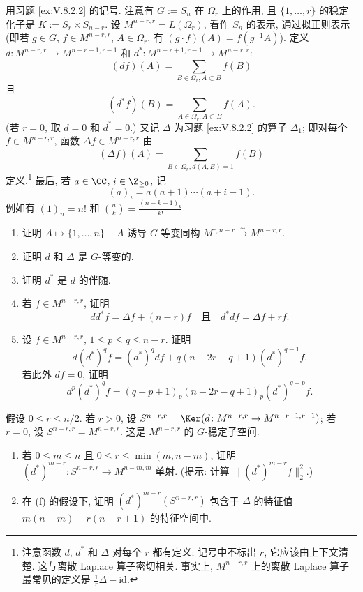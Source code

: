 \begin{exercise}[对称幂的分解]
\label{ex:V.8.2.3}
用习题 \ref{ex:V.8.2.2} 的记号. 注意有 $G := S_n$ 在 $\Omega_r$ 上的作用, 且 $\{1, \ldots, r\}$ 的稳定化子是 $K := S_r \times S_{n-r}$. 设 $M^{n-r,r} = L(\Omega_r)$, 看作 $S_n$ 的表示, 通过拟正则表示 (即若 $g \in G$, $f \in M^{n-r,r}$, $A \in \Omega_r$, 有 $(g \cdot f)(A) = f(g^{-1}A)$).
定义 $d \colon M^{n-r,r} \to M^{n-r+1,r-1}$ 和 $d^* \colon M^{n-r+1,r-1} \to M^{n-r,r}$:
\[
(df)(A) = \sum_{B \in \Omega_r, A \subset B}f(B)
\]
且
\[
(d^*f)(B) = \sum_{A \in \Omega_r, A \subset B}f(A).
\]
(若 $r = 0$, 取 $d = 0$ 和 $d^* = 0$.)
又记 $\Delta$ 为习题 \ref{ex:V.8.2.2} 的算子 $\Delta_1$; 即对每个 $f \in M^{n-r,r}$, 函数 $\Delta f \in M^{n-r,r}$ 由
\[
(\Delta f)(A) = \sum_{B \in \Omega_r, d(A,B)=1}f(B)
\]
定义.\footnote{注意函数 $d$, $d^*$ 和 $\Delta$ 对每个 $r$ 都有定义; 记号中不标出 $r$, 它应该由上下文清楚. 这与离散 Laplace 算子密切相关. 事实上, $M^{n-r,r}$ 上的离散 Laplace 算子最常见的定义是 $\frac{1}{r}\Delta - \mathrm{id}$.}
最后, 若 $a \in \CC$, $i \in \Z_{\geq 0}$, 记
\[
(a)_i = a(a+1)\cdots(a+i-1).
\]
例如有 $(1)_n = n!$ 和 $\binom{n}{k} = \frac{(n-k+1)_k}{k!}$.
\begin{enumerate}
\item[(a)] 证明 $A \longmapsto \{1, \ldots, n\} - A$ 诱导 $G$-等变同构 $M^{r,n-r} \xrightarrow{\sim} M^{n-r,r}$.
\item[(b)] 证明 $d$ 和 $\Delta$ 是 $G$-等变的.
\item[(c)] 证明 $d^*$ 是 $d$ 的伴随.
\item[(d)] 若 $f \in M^{n-r,r}$, 证明
\[
dd^*f = \Delta f + (n-r)f \quad \text{且} \quad d^*df = \Delta f + rf.
\]
\item[(e)] 设 $f \in M^{n-r,r}$, $1 \leq p \leq q \leq n - r$. 证明
\[
d(d^*)^qf = (d^*)^qdf + q(n - 2r - q + 1)(d^*)^{q-1}f.
\]
若此外 $df = 0$, 证明
\[
d^p(d^*)^qf = (q - p + 1)_p(n - 2r - q + 1)_p(d^*)^{q-p}f.
\]
\end{enumerate}
假设 $0 \leq r \leq n/2$. 若 $r > 0$, 设 $S^{n-r,r} = \Ker(d \colon M^{n-r,r} \to M^{n-r+1,r-1})$; 若 $r = 0$, 设 $S^{n-r,r} = M^{n-r,r}$. 这是 $M^{n-r,r}$ 的 $G$-稳定子空间.
\begin{enumerate}
\item[(f)] 若 $0 \leq m \leq n$ 且 $0 \leq r \leq \min(m, n - m)$, 证明 $(d^*)^{m-r} \colon S^{n-r,r} \to M^{n-m,m}$ 单射. (提示: 计算 $\|(d^*)^{m-r}f\|_2^2$.)
\item[(g)] 在 (f) 的假设下, 证明 $(d^*)^{m-r}(S^{n-r,r})$ 包含于 $\Delta$ 的特征值 $m(n-m) - r(n-r+1)$ 的特征空间中.

\end{enumerate}
\end{exercise}
